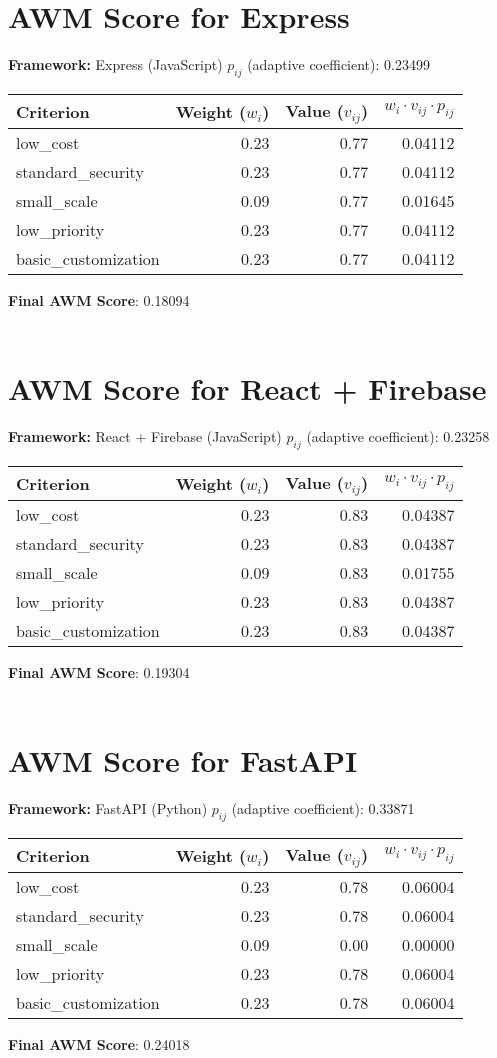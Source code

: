 \documentclass{article}
\begin{document}
\section*{AWM Score for Express}
\textbf{Framework:} Express (JavaScript)
$p_{ij}$ (adaptive coefficient): 0.23499
\begin{longtable}{l r r r} 
\toprule
Criterion & Weight ($w_i$) & Value ($v_{ij}$) & $w_i \cdot v_{ij} \cdot p_{ij}$ \\ \midrule
low\_cost & 0.23 & 0.77 & 0.04112 \\
standard\_security & 0.23 & 0.77 & 0.04112 \\
small\_scale & 0.09 & 0.77 & 0.01645 \\
low\_priority & 0.23 & 0.77 & 0.04112 \\
basic\_customization & 0.23 & 0.77 & 0.04112 \\
\bottomrule \end{longtable}
\textbf{Final AWM Score}: 0.18094 \\\\
\section*{AWM Score for React + Firebase}
\textbf{Framework:} React + Firebase (JavaScript)
$p_{ij}$ (adaptive coefficient): 0.23258
\begin{longtable}{l r r r} 
\toprule
Criterion & Weight ($w_i$) & Value ($v_{ij}$) & $w_i \cdot v_{ij} \cdot p_{ij}$ \\ \midrule
low\_cost & 0.23 & 0.83 & 0.04387 \\
standard\_security & 0.23 & 0.83 & 0.04387 \\
small\_scale & 0.09 & 0.83 & 0.01755 \\
low\_priority & 0.23 & 0.83 & 0.04387 \\
basic\_customization & 0.23 & 0.83 & 0.04387 \\
\bottomrule \end{longtable}
\textbf{Final AWM Score}: 0.19304 \\\\
\section*{AWM Score for FastAPI}
\textbf{Framework:} FastAPI (Python)
$p_{ij}$ (adaptive coefficient): 0.33871
\begin{longtable}{l r r r} 
\toprule
Criterion & Weight ($w_i$) & Value ($v_{ij}$) & $w_i \cdot v_{ij} \cdot p_{ij}$ \\ \midrule
low\_cost & 0.23 & 0.78 & 0.06004 \\
standard\_security & 0.23 & 0.78 & 0.06004 \\
small\_scale & 0.09 & 0.00 & 0.00000 \\
low\_priority & 0.23 & 0.78 & 0.06004 \\
basic\_customization & 0.23 & 0.78 & 0.06004 \\
\bottomrule \end{longtable}
\textbf{Final AWM Score}: 0.24018 \\\\
\end{document}
